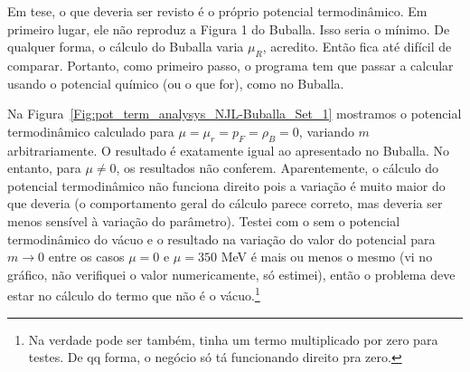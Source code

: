 Em tese, o que deveria ser revisto é o próprio potencial termodinâmico. Em primeiro lugar, ele não reproduz a Figura 1 do Buballa\cite{Buballa1996}. Isso seria o mínimo. De qualquer forma, o cálculo do Buballa varia $\mu_R$, acredito. Então fica até difícil de comparar. Portanto, como primeiro passo, o programa tem que passar a calcular usando o potencial químico (ou o que for), como no Buballa.

Na Figura~\ref{Fig:pot_term_analysys_NJL-Buballa_Set_1} mostramos o potencial termodinâmico calculado para $\mu = \mu_r = p_F = \rho_B = 0$, variando $m$ arbitrariamente. O resultado é exatamente igual ao apresentado no Buballa. No entanto, para $\mu \neq 0$, os resultados não conferem. Aparentemente, o cálculo do potencial termodinâmico não funciona direito pois a variação é muito maior do que deveria (o comportamento geral do cálculo parece correto, mas deveria ser menos sensível à variação do parâmetro). Testei com o sem o potencial termodinâmico do vácuo e o resultado na variação do valor do potencial para $m \to 0$ entre os casos $\mu = 0$ e $\mu = 350$ MeV é mais ou menos o mesmo (vi no gráfico, não verifiquei o valor numericamente, só estimei), então o problema deve estar no cálculo do termo que não é o vácuo.\footnote{Na verdade pode ser também, tinha um termo multiplicado por zero para testes. De qq forma, o negócio só tá funcionando direito pra zero.}

\begin{figure*}
	
	\caption{Gráfico do potencial termodinâmico $\tilde{\omega}$ obtido variando $m$ arbitrariamente, para o valor $\mu = \mu_R = 0$. \protect}
	\label{Fig:pot_term_analysys_NJL-Buballa_Set_1}
\end{figure*}

\begin{figure*}
	
	\caption{Gráfico do momento de Fermi $p_F$. \protect}
	\label{Fig:fermi_momentum_NJL-Buballa_Set_1}
\end{figure*}

\begin{figure*}
	
	\caption{Gráfico da equação cuja raíz determina o valor de $m_{\rm{vac}}$. \protect}
	\label{Fig:vacuum_mass_equation_NJL-Buballa_Set_1}
\end{figure*}

